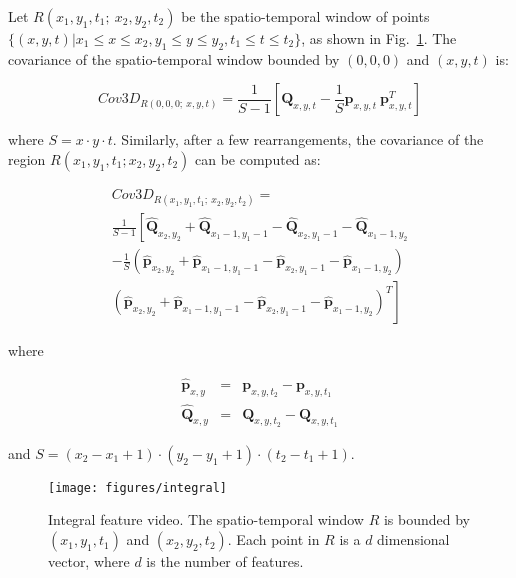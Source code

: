 \documentclass[10pt,twocolumn,letterpaper]{article}
\newcommand{\fig}[1]{\mbox{Fig.~\ref{#1}}}
\newcommand{\eqsize}{\footnotesize}
\newcommand{\cov}{{Cov3D}}
\newcommand{\vect}[1]{{\boldsymbol{#1}}}
\newcommand{\mat}[1]{{\boldsymbol{#1}}}
\begin{document}
Let {\eqsize $R(x_1,y_1,t_1;~ x_2,y_2,t_2)$}
be the spatio-temporal window of points
{\eqsize $\{(x,y,t) | x_1 \leq x \leq x_2, y_1 \leq y \leq y_2, t_1 \leq t \leq t_2\}$},
as shown in \fig{fig:integral}.
The covariance of the spatio-temporal window bounded by {\eqsize $(0,0,0)$} and {\eqsize $(x,y,t)$} is:

\vspace{-2ex}
\eqsize
\begin{equation}
  \cov_{R(0,0,0;~ x,y,t)} = \frac{1}{S-1} \left[ \mat{Q}_{x,y,t} - \frac{1}{S} \vect{p}_{x,y,t} ~ \vect{p}_{x,y,t}^T \right]
\end{equation}
\normalsize

\noindent
where {\eqsize $S = x \cdot y \cdot t$}.
Similarly, after a few rearrangements,
the covariance of the region {\eqsize $R(x_1,y_1,t_1;x_2,y_2,t_2)$} can be computed as:

\noindent
\eqsize
\begin{multline}
  \cov_{R(x_1,y_1,t_1;~ x_2,y_2,t_2)} =\\
    \frac{1}{S-1} \left[ \widehat{\mat{Q}}_{x_2,y_2} + \widehat{\mat{Q}}_{x_1-1,y_1-1} - \widehat{\mat{Q}}_{x_2,y_1-1} - \widehat{\mat{Q}}_{x_1-1,y_2} \right.\\
                         - \frac{1}{S} \left( \widehat{\vect{p}}_{x_2,y_2} + \widehat{\vect{p}}_{x_1-1,y_1-1} - \widehat{\vect{p}}_{x_2,y_1-1} - \widehat{\vect{p}}_{x_1-1,y_2} \right)\\
                  \left. \left( \widehat{\vect{p}}_{x_2,y_2} + \widehat{\vect{p}}_{x_1-1,y_1-1} - \widehat{\vect{p}}_{x_2,y_1-1} - \widehat{\vect{p}}_{x_1-1,y_2} \right)^T \right]
\end{multline}
\normalsize

\noindent
where
\vspace{-3ex}

\noindent
\eqsize
\begin{eqnarray}
  \widehat{\vect{p}}_{x,y} &=& \vect{p}_{x,y,t_2} - \vect{p}_{x,y,t_1}\\
  \widehat{\mat{Q}}_{x,y} &=& \mat{Q}_{x,y,t_2} - \mat{Q}_{x,y,t_1}
\end{eqnarray}
\normalsize

\noindent
and {\eqsize $S = (x_2 - x_1 + 1) \cdot (y_2 - y_1 + 1) \cdot (t_2 - t_1 + 1)$}.

\begin{figure}[!b]
  \vspace{-3ex}
  \centering
  \texttt{[image: figures/integral]}
\caption
    {
    \small
    Integral feature video.
    The spatio-temporal window {\eqsize $R$} is bounded by {\eqsize $(x_1,y_1,t_1)$} and {\eqsize $(x_2,y_2,t_2)$}.
    Each point in {\eqsize $R$} is a {\eqsize $d$} dimensional vector,
    where {\eqsize $d$} is the number of features.
    }
  \label{fig:integral}
\end{figure}
\end{document}
